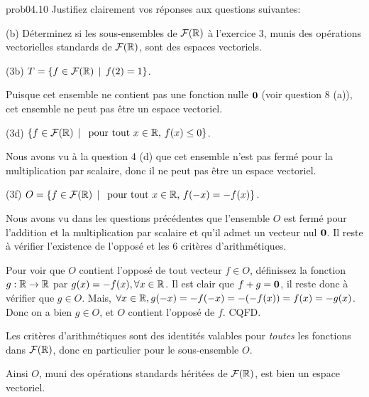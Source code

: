 \bigskip
\begin{sol}{prob04.10} Justifiez clairement vos
réponses aux questions suivantes:

\medskip
(b)  Déterminez si les sous-ensembles de $\mathcal{F}(\mathbb{R})$ à l'exercice 3,
  munis des opérations vectorielles standards de $\mathcal{F}(\mathbb{R})$, sont des
  espaces vectoriels.

\medskip
(3b) $T=\{f \in \mathcal{F}(\mathbb{R}) \, \mid \, f(2)=1 \}$.

\soln Puisque cet ensemble ne contient pas une fonction nulle $\mathbf{0}$ (voir question 8 (a)),
cet ensemble ne peut pas être un espace vectoriel.

\medskip
(3d)
$\{f \in \mathcal{F}(\mathbb{R}) \, \mid \, \text{ pour tout } x\in \mathbb{R},   \, f(x)\le 0\}$.

\soln Nous avons vu à la question 4 (d) que cet ensemble n'est pas fermé pour la
multiplication par scalaire, donc il ne peut pas être un espace vectoriel.

\medskip
(3f)
$O=\{f \in \mathcal{F}(\mathbb{R}) \, \mid \, \text{ pour tout } x\in \mathbb{R},   \, f(-x)= -f(x)\}$.

\soln Nous avons vu dans les questions précédentes que l'ensemble $O$ est fermé pour
l'addition et la multiplication par scalaire et qu'il admet un vecteur nul $\mathbf{0}$. Il reste \`a v\'erifier
l'existence de l'oppos\'e et les 6 crit\`eres d'arithmétiques.

Pour voir que $O$ contient l'opposé de tout vecteur $f\in O$, définissez la fonction
$g: \mathbb{R} \to \mathbb{R}$ par $g(x)=-f(x), \forall x\in \mathbb{R}$. Il est clair que
$f+g=\mathbf{0}$, il reste donc à v\'erifier que $g\in O$. Mais,
$\forall x\in \mathbb{R}, g(-x)= -f(-x)=-(-f(x))=f(x)=-g(x)$. Donc on a bien $g\in O$, et $O$ contient l'opposé de $f$. CQFD.

Les crit\`eres d'arithmétiques sont des identités
valables pour {\emph{toutes}} les fonctions dans $\mathcal{F}(\mathbb{R})$, donc en particulier pour le sous-ensemble $O$. 

Ainsi $O$, muni des opérations standards héritées de $\mathcal{F}(\mathbb{R})$, est bien
un espace vectoriel.
\medskip
\end{sol}

